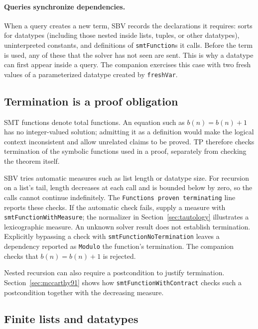\documentclass[review]{jfp-epi}
\newcommand{\code}[1]{\texttt{#1}}
\newcounter{exercise}
\begin{document}
\paragraph{Queries synchronize dependencies.}
When a query creates a new term, SBV records the declarations it requires: sorts
for datatypes (including those nested inside lists, tuples, or other datatypes),
uninterpreted constants, and definitions of \code{smtFunction}s it calls. Before
the term is used, any of these that the solver has not seen are sent. This is why
a datatype can first appear inside a query. The companion exercises this case
with two fresh values of a parameterized datatype created by \code{freshVar}.

\subsection{Termination is a proof obligation}
\label{sec:termination}

SMT functions denote total functions. An equation such as $b(n)=b(n)+1$ has
no integer-valued solution; admitting it as a definition would make the logical
context inconsistent and allow unrelated claims to be proved. TP therefore
checks termination of the symbolic functions used in a proof, separately from
checking the theorem itself.

SBV tries automatic measures such as list length or datatype size. For recursion
on a list's tail, length decreases at each call and is bounded below by zero,
so the calls cannot continue indefinitely. The
\code{Functions proven terminating} line reports these checks. If the automatic
check fails, supply a measure with \code{smtFunctionWithMeasure}; the normalizer
in Section~\ref{sec:tautology} illustrates a lexicographic measure. An unknown
solver result does not establish termination. Explicitly bypassing a check with
\code{smtFunctionNoTermination} leaves a dependency reported as \code{Modulo}
the function's termination. The companion checks that $b(n)=b(n)+1$ is rejected.

Nested recursion can also require a postcondition to justify termination.
Section~\ref{sec:mccarthy91} shows how \code{smtFunctionWithContract} checks
such a postcondition together with the decreasing measure.

\subsection{Finite lists and datatypes}
\label{sec:finite-lists}
\end{document}
